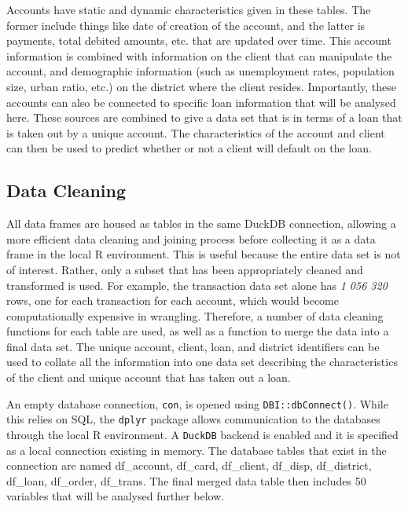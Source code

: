 \documentclass[11pt,preprint, authoryear]{elsarticle}
\numberwithin{equation}{section}
\numberwithin{figure}{section}
\numberwithin{table}{section}
\begin{document}
Accounts have static and dynamic characteristics given in these tables.
The former include things like date of creation of the account, and the
latter is payments, total debited amounts, etc. that are updated over
time. This account information is combined with information on the
client that can manipulate the account, and demographic information
(such as unemployment rates, population size, urban ratio, etc.) on the
district where the client resides. Importantly, these accounts can also
be connected to specific loan information that will be analysed here.
These sources are combined to give a data set that is in terms of a loan
that is taken out by a unique account. The characteristics of the
account and client can then be used to predict whether or not a client
will default on the loan.

\hypertarget{data-cleaning}{%
\subsection{Data Cleaning}\label{data-cleaning}}

All data frames are housed as tables in the same DuckDB connection,
allowing a more efficient data cleaning and joining process before
collecting it as a data frame in the local R environment. This is useful
because the entire data set is not of interest. Rather, only a subset
that has been appropriately cleaned and transformed is used. For
example, the transaction data set alone has \emph{1 056 320} rows, one
for each transaction for each account, which would become
computationally expensive in wrangling. Therefore, a number of data
cleaning functions for each table are used, as well as a function to
merge the data into a final data set. The unique account, client, loan,
and district identifiers can be used to collate all the information into
one data set describing the characteristics of the client and unique
account that has taken out a loan.

An empty database connection, \texttt{con}, is opened using
\texttt{DBI::dbConnect()}. While this relies on SQL, the \texttt{dplyr}
package allows communication to the databases through the local R
environment. A \texttt{DuckDB} backend is enabled and it is specified as
a local connection existing in memory. The database tables that exist in
the connection are named df\_account, df\_card, df\_client, df\_disp,
df\_district, df\_loan, df\_order, df\_trans. The final merged data
table then includes 50 variables that will be analysed further below.
\end{document}
